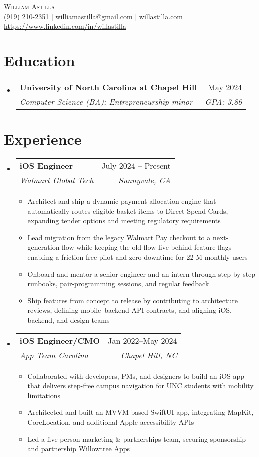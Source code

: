 \documentclass[letterpaper,11pt]{article}
\makeatletter
\newcommand{\resumeItem}[1]{
  \item\small{{#1}}
}
\newcommand{\resumeExperience}[4]{
  \vspace{-2pt}\item
    \begin{tabular*}{0.97\textwidth}[t]{l@{\extracolsep{\fill}}r}
      \textbf{#1} & #2 \\
      \textit{#3} & \textit{#4} \\
    \end{tabular*}
}
\newcommand{\resumeSubheading}[4]{
  \vspace{-2pt}\item
    \begin{tabular*}{0.97\textwidth}[t]{l@{\extracolsep{\fill}}r}
      \textbf{#1} & #2 \\
      \textit{\small#3} & \textit{\small #4} \\
    \end{tabular*}\vspace{-7pt}
}
\newcommand{\resumeSubHeadingListStart}{\begin{itemize}[leftmargin=0.15in, label={}]}
\newcommand{\resumeSubHeadingListEnd}{\end{itemize}}
\newcommand{\resumeItemListStart}{\begin{itemize}}
\newcommand{\resumeItemListEnd}{\end{itemize}\vspace{-5pt}}
\makeatother
\begin{document}
\begin{center}
    {\Huge \scshape William Astilla} \\ \vspace{2pt}
    \small
    (919) 210-2351 $|$ \href{mailto:williamastilla@gmail.com}{williamastilla@gmail.com} $|$ \href{https://www.willastilla.com}{willastilla.com} $|$ \href{linkedin.com/in/willastilla}{https://www.linkedin.com/in/willastilla}
\end{center}

\section{Education}
  \resumeSubHeadingListStart
    \resumeSubheading
      {University of North Carolina at Chapel Hill}{May 2024}
      {Computer Science (BA); Entrepreneurship minor}{\textit{GPA: 3.86}}
  \resumeSubHeadingListEnd

\section{Experience}
  \resumeSubHeadingListStart
  \resumeExperience
    {iOS Engineer}{July 2024 -- Present}{Walmart Global Tech}{Sunnyvale, CA}
    \resumeItemListStart
      \resumeItem{Architect and ship a dynamic payment-allocation engine that automatically routes eligible basket items to Direct Spend Cards, expanding tender options and meeting regulatory requirements}
      \resumeItem{Lead migration from the legacy Walmart Pay checkout to a next-generation flow while keeping the old flow live behind feature flags—enabling a friction-free pilot and zero downtime for 22 M monthly users}
      \resumeItem{Onboard and mentor a senior engineer and an intern through step-by-step runbooks, pair-programming sessions, and regular feedback}
      \resumeItem{Ship features from concept to release by contributing to architecture reviews, defining mobile–backend API contracts, and aligning iOS, backend, and design teams}
    \resumeItemListEnd
    \resumeExperience
      {iOS Engineer/CMO}{Jan 2022--May 2024}{App Team Carolina}{Chapel Hill, NC}
    \resumeItemListStart
      \resumeItem{Collaborated with developers, PMs, and designers to build an iOS app that delivers step-free campus navigation for UNC students with mobility limitations}
      \resumeItem{Architected and built an MVVM-based SwiftUI app, integrating MapKit, CoreLocation, and additional Apple accessibility APIs}
      \resumeItem{Led a five-person marketing & partnerships team, securing sponsorship and partnership Willowtree Apps}
    \resumeItemListEnd
  \resumeSubHeadingListEnd
\end{document}

